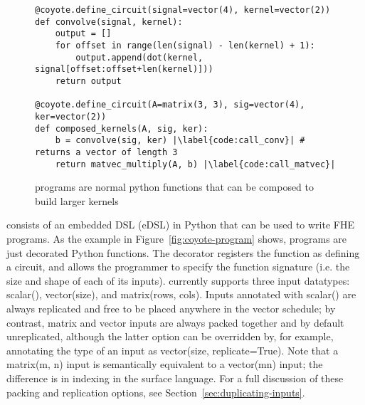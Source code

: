   
    

\begin{figure}
    \begin{verbatim}
@coyote.define_circuit(signal=vector(4), kernel=vector(2))
def convolve(signal, kernel):
    output = []
    for offset in range(len(signal) - len(kernel) + 1):
        output.append(dot(kernel, signal[offset:offset+len(kernel)]))
    return output
    
@coyote.define_circuit(A=matrix(3, 3), sig=vector(4), ker=vector(2))
def composed_kernels(A, sig, ker):
    b = convolve(sig, ker) |\label{code:call_conv}| # returns a vector of length 3
    return matvec_multiply(A, b) |\label{code:call_matvec}|
    \end{verbatim}
    \caption{\system programs are normal python functions that can be composed to build larger kernels}\label{fig:coyote-programs-compose}
\end{figure}

\system consists of an embedded DSL (eDSL) in Python that can be used to write FHE programs.
As the example in Figure~\ref{fig:coyote-program} shows, \system programs are just decorated Python functions.
The decorator registers the function as defining a \system circuit, and allows the programmer to specify the function signature (i.e. the size and shape of each of its inputs).
\system currently supports three input datatypes: {\sf scalar()}, {\sf vector(size)}, and {\sf matrix(rows, cols)}.
Inputs annotated with {\sf scalar()} are always replicated and free to be placed anywhere in the vector schedule; by contrast, {\sf matrix} and {\sf vector} inputs are always packed together and by default unreplicated, although the latter option can be overridden by, for example, annotating the type of an input as {\sf vector(size, replicate=True)}.
Note that a {\sf matrix(m, n)} input is semantically equivalent to a {\sf vector(mn)} input; the difference is in indexing in the surface language.
For a full discussion of these packing and replication options, see Section~\ref{sec:duplicating-inputs}. %

